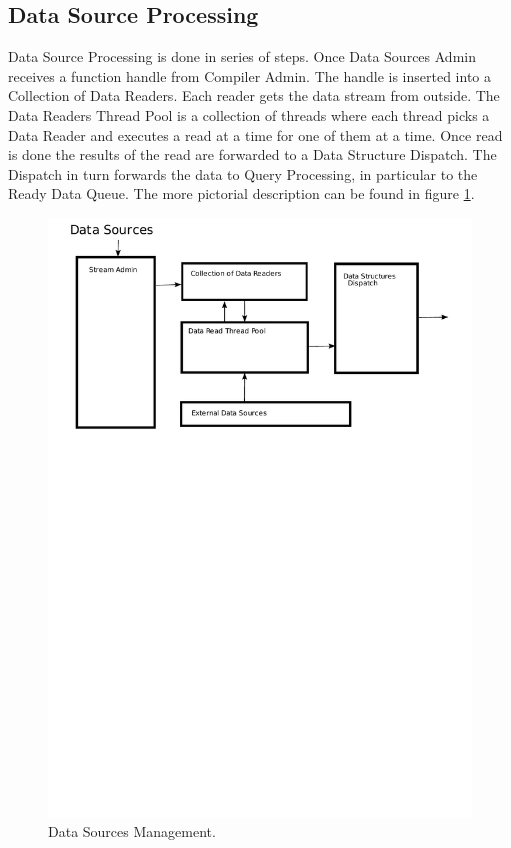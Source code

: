 \documentclass[11pt]{article}
\begin{document}
\subsection{Data Source Processing}

Data Source Processing is done in series of steps. Once Data Sources Admin receives a function handle from Compiler Admin. The handle is inserted into a Collection of Data Readers. Each reader gets the data stream from outside. The Data Readers Thread Pool is a collection of threads where each thread picks a Data Reader and executes a read at a time for one of them at a time. Once read is done the results of the read are forwarded to a Data Structure Dispatch. The Dispatch in turn forwards the data to Query Processing, in particular to the Ready Data Queue. The more pictorial description can be found in figure \ref{DataSourcePic}.


\begin{figure}
  \includegraphics[width=5.00in]{DataSources.pdf}
  \caption{Data Sources Management.}
  \label{DataSourcePic}
\end{figure}
\end{document}
